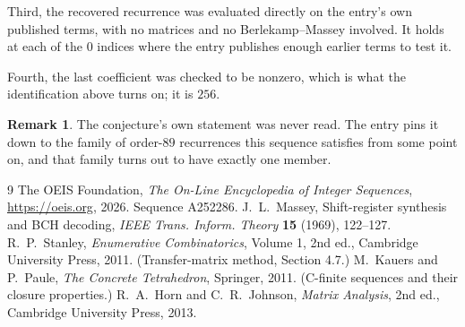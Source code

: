 \documentclass[11pt,a4paper]{article}
\theoremstyle{plain}
\theoremstyle{definition}
\newtheorem{remark}[theorem]{Remark}
\begin{document}
Third, the recovered recurrence was evaluated directly on the entry's own published terms, with
no matrices and no Berlekamp--Massey involved. It holds at each of the $0$ indices where
the entry publishes enough earlier terms to test it.

Fourth, the last coefficient was checked to be nonzero, which is what the identification above
turns on; it is $256$.

\begin{remark}
The conjecture's own statement was never read. The entry pins it down to the family of
order-$89$ recurrences this sequence satisfies from some point on, and that family turns
out to have exactly one member.
\end{remark}

\begin{thebibliography}{9}
 The OEIS Foundation, \emph{The On-Line Encyclopedia of Integer
Sequences}, \url{https://oeis.org}, 2026. Sequence A252286.
 J.~L.~Massey, Shift-register synthesis and BCH decoding, \emph{IEEE
Trans. Inform. Theory} \textbf{15} (1969), 122--127.
 R.~P.~Stanley, \emph{Enumerative Combinatorics}, Volume 1, 2nd ed.,
Cambridge University Press, 2011. (Transfer-matrix method, Section 4.7.)
 M.~Kauers and P.~Paule, \emph{The Concrete Tetrahedron}, Springer, 2011.
(C-finite sequences and their closure properties.)
 R.~A.~Horn and C.~R.~Johnson, \emph{Matrix Analysis}, 2nd ed., Cambridge
University Press, 2013.
\end{thebibliography}
\end{document}
